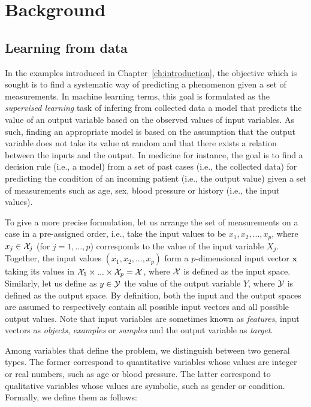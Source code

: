 \chapter{Background}\label{ch:background}

\section{Learning from data}

In the examples introduced in Chapter~\ref{ch:introduction}, the objective
which is sought is to find a systematic way of predicting a phenomenon given a
set of measurements. In machine learning terms, this goal is formulated as the
{\it supervised learning} task of infering from collected data a model that
predicts the value of an output variable based on the observed values of input
variables. As such, finding an appropriate model is based on the assumption
that the output variable does not take its value at random and that there
exists a relation between the inputs and the output. In medicine for instance,
the goal is to find a decision rule (i.e., a model) from a set of past cases
(i.e., the collected data) for predicting the condition of an incoming patient
(i.e., the output value) given a set of measurements such as age, sex, blood
pressure or history (i.e., the input values).

To give a more precise formulation, let us arrange the set of measurements on a
case in a pre-assigned order, i.e., take the input values to be $x_1, x_2, ...,
x_p$, where $x_j \in {\cal X}_j$ (for $j = 1, ..., p$) corresponds to the value
of the input variable $X_j$. Together, the input values $(x_1, x_2, ..., x_p)$
form a $p$-dimensional input vector $\mathbf{x}$ taking its values in ${\cal
X}_1 \times ... \times {\cal X}_p = {\cal X}$, where ${\cal X}$ is defined as
the input space. Similarly, let us define as $y \in {\cal Y}$ the value of the
output variable $Y$, where ${\cal Y}$ is defined as the output space. By
definition, both the input and the output spaces are assumed to respectively
contain all possible input vectors and all possible output values.
Note that input variables are sometimes known as {\it features}, input
vectors as {\it objects}, {\it examples} or {\it samples} and the output
variable as {\it target}.

Among variables that define the problem, we distinguish between two general
types. The former correspond to quantitative variables whose values are integer
or real numbers, such as age or blood pressure. The latter correspond to
qualitative variables whose values are symbolic, such as gender or condition.
Formally, we define them as follows:

